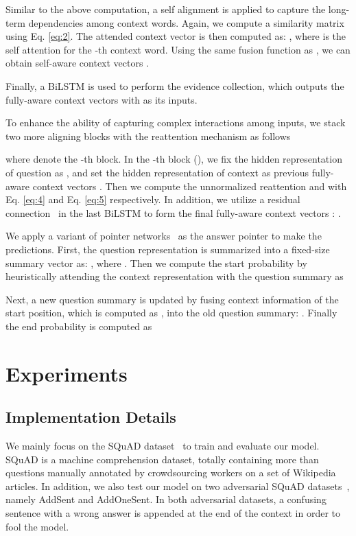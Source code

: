\documentclass{article}
\begin{document}
Similar to the above computation, a self alignment is applied to capture the long-term dependencies among context words. Again, we compute a similarity matrix  using Eq. \ref{eq:2}. The attended context vector is then computed as: , where  is the self attention for the -th context word. Using the same fusion function as , we can obtain self-aware context vectors .

Finally, a BiLSTM is used to perform the evidence collection, which outputs the fully-aware context vectors  with  as its inputs.

To enhance the ability of capturing complex interactions among inputs, we stack two more aligning blocks with the reattention mechanism as follows


where  denote the -th block. 
In the -th block (), we fix the hidden representation of question as , and set the hidden representation of context as previous fully-aware context vectors . Then we compute the unnormalized reattention  and  with Eq. \ref{eq:4} and Eq. \ref{eq:5} respectively.
In addition, we utilize a residual connection~\cite{He16} in the last BiLSTM to form the final fully-aware context vectors : .

We apply a variant of pointer networks~\cite{Vinyals15} as the answer pointer to make the predictions.
First, the question representation  is summarized into a fixed-size summary vector  as: , where .
Then we compute the start probability  by heuristically attending the context representation  with the question summary  as


Next, a new question summary  is updated by fusing context information of the start position, which is computed as , into the old question summary: . 
Finally the end probability  is computed as

 \section{Experiments}
\subsection{Implementation Details}
We mainly focus on the SQuAD dataset~\cite{Rajpurkar16} to train and evaluate our model. SQuAD is a machine comprehension dataset, totally containing more than  questions manually annotated by crowdsourcing workers on a set of  Wikipedia articles. In addition, we also test our model on two adversarial SQuAD datasets~\cite{Jia17}, namely AddSent and AddOneSent. In both adversarial datasets, a confusing sentence with a wrong answer is appended at the end of the context in order to fool the model.
\end{document}
